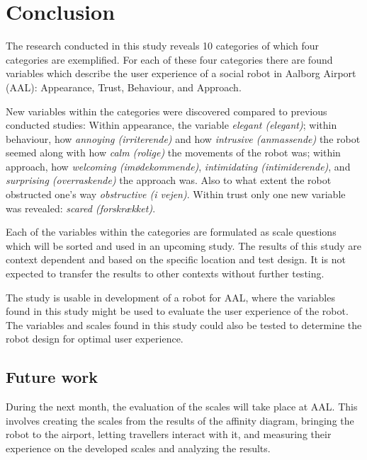 \section{Conclusion}
\label{Conclusion}
%
The research conducted in this study reveals 10 categories of which four categories are exemplified. For each of these four categories there are found variables which describe the user experience of a social robot in Aalborg Airport (AAL): Appearance, Trust, Behaviour, and Approach.

New variables within the categories were discovered compared to previous conducted studies: Within appearance, the variable \textit{elegant (elegant)}; within behaviour, how \textit{annoying (irriterende)} and how \textit{intrusive (anmassende)} the robot seemed along with how \textit{calm (rolige)} the movements of the robot was; within approach, how \textit{welcoming (imødekommende)}, \textit{intimidating (intimiderende)}, and \textit{surprising (overraskende)} the approach was. Also to what extent the robot obstructed one's way \textit{obstructive (i vejen)}. Within trust only one new variable was revealed: \textit{scared (forskrækket)}.

Each of the variables within the categories are formulated as scale questions which will be sorted and used in an upcoming study. The results of this study are context dependent and based on the specific location and test design. It is not expected to transfer the results to other contexts without further testing. 

The study is usable in development of a robot for AAL, where the variables found in this study might be used to evaluate the user experience of the robot. The variables and scales found in this study could also be tested to determine the robot design for optimal user experience.

\subsection{Future work}
During the next month, the evaluation of the scales will take place at AAL. This involves creating the scales from the results of the affinity diagram, bringing the robot to the airport, letting travellers interact with it, and measuring their experience on the developed scales and analyzing the results.

